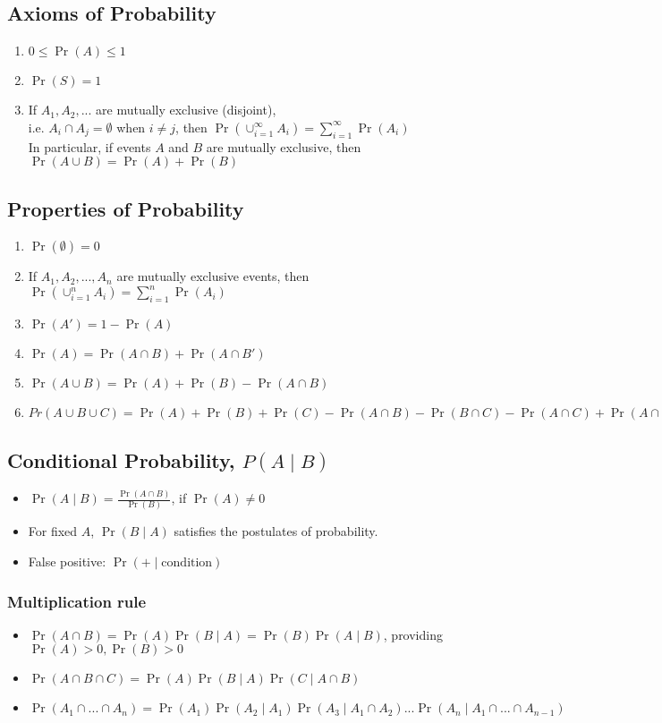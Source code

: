 \documentclass[10pt]{article}
\begin{document}
\subsection*{Axioms of Probability}
\begin{enumerate}
    \item $0 \leq \Pr(A) \leq 1$
    \item $\Pr(S) = 1$
    \item If $A_1, A_2, ...$ are mutually exclusive (disjoint),\\ i.e. $A_i \cap A_j = \emptyset$ when $i \neq j$, then $\Pr(\cup_{i=1}^\infty A_i) = \sum_{i=1}^{\infty}\Pr(A_i)$ \\
          In particular, if events $A$ and $B$ are mutually exclusive, then $\Pr(A\cup B) = \Pr(A) + \Pr(B)$
\end{enumerate}
\subsection*{Properties of Probability}
\begin{enumerate}
    \item $\Pr(\emptyset) = 0$
    \item If $A_1, A_2, ..., A_n$ are mutually exclusive events, then $\Pr(\cup_{i=1}^{n}A_i) = \sum_{i=1}^{n}\Pr(A_i)$
    \item $\Pr(A') = 1 - \Pr(A)$
    \item $\Pr(A) = \Pr(A \cap B) + \Pr(A \cap B')$
    \item $\Pr(A \cup B) = \Pr(A) + \Pr(B) - \Pr(A \cap B)$
    \item $Pr (A \cup B \cup C) = \Pr(A) + \Pr(B) + \Pr(C) - \Pr(A \cap B) - \Pr(B \cap C) - \Pr(A \cap C) + \Pr(A \cap B \cap C)$
\end{enumerate}
\subsection*{Conditional Probability, $P(A\mid B)$}
\begin{itemize}
    \item $\Pr(A\mid B) = \frac{\Pr(A\cap B)}{\Pr(B)}$, if $\Pr(A) \neq 0$
    \item For fixed $A$, $\Pr(B\mid A)$ satisfies the postulates of probability.
    \item False positive: $\Pr(\text{+} \mid \text{condition})$
\end{itemize}
\subsubsection*{Multiplication rule}
\begin{itemize}
    \item $\Pr(A\cap B) = \Pr(A) \Pr(B\mid A) = \Pr(B)\Pr(A\mid B)$, providing $\Pr(A) > 0, \Pr(B) > 0$
    \item $\Pr(A\cap B \cap C) = \Pr(A)\Pr(B\mid A)\Pr(C\mid A\cap B)$
    \item $\Pr(A_1\cap...\cap A_n) = \Pr(A_1)\Pr(A_2\mid A_1)\Pr(A_3 \mid A_1 \cap A_2)...\Pr(A_n\mid A_1\cap ... \cap A_{n - 1})$
\end{itemize}
\end{document}
